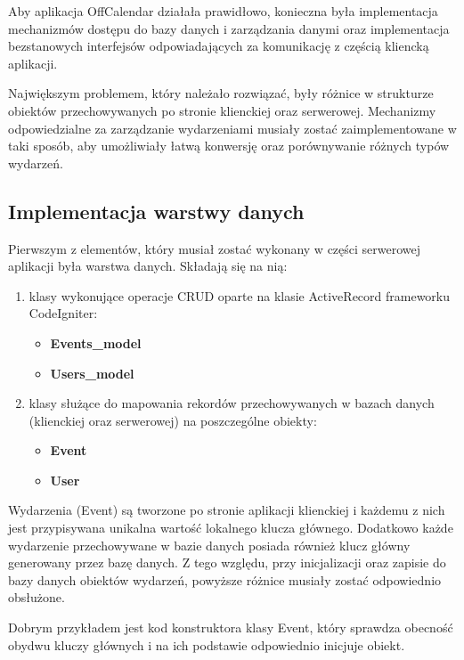 Aby aplikacja OffCalendar działała prawidłowo, konieczna była implementacja mechanizmów dostępu do bazy danych i zarządzania danymi oraz implementacja bezstanowych interfejsów odpowiadających za komunikację z częścią kliencką aplikacji.

Największym problemem, który należało rozwiązać, były różnice w strukturze obiektów przechowywanych po stronie klienckiej oraz serwerowej. Mechanizmy odpowiedzialne za zarządzanie wydarzeniami musiały zostać zaimplementowane w taki sposób, aby umożliwiały łatwą konwersję oraz porównywanie różnych typów wydarzeń.

\subsection{Implementacja warstwy danych}
\label{komBazaDanych}

Pierwszym z elementów, który musiał zostać wykonany w części serwerowej aplikacji była warstwa danych. Składają się na nią: 

\begin{enumerate}
\item klasy wykonujące operacje CRUD oparte na klasie ActiveRecord\cite{ciActiveRecord} frameworku CodeIgniter:
\begin{itemize}
\item \textbf{Events\_model}
\item \textbf{Users\_model}
\end{itemize}
\item klasy służące do mapowania rekordów przechowywanych w bazach danych (klienckiej oraz serwerowej) na poszczególne obiekty:
\begin{itemize}
\item \textbf{Event}
\item \textbf{User}
\end{itemize}
\end{enumerate}

Wydarzenia (Event) są tworzone po stronie aplikacji klienckiej i każdemu z nich jest przypisywana unikalna wartość lokalnego klucza głównego. Dodatkowo każde wydarzenie przechowywane w bazie danych posiada również klucz główny generowany przez bazę danych. Z tego względu, przy inicjalizacji oraz zapisie do bazy danych obiektów wydarzeń, powyższe różnice musiały zostać odpowiednio obsłużone.

Dobrym przykładem jest kod konstruktora klasy Event, który sprawdza obecność obydwu kluczy głównych i na ich podstawie odpowiednio inicjuje obiekt.

